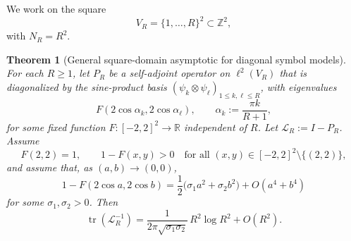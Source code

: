 \documentclass[reqno]{amsart}
\numberwithin{equation}{section}
\newtheorem{theorem}{Theorem}[section]
\theoremstyle{definition}
\theoremstyle{remark}
\DeclareMathOperator{\tr}{tr}
\begin{document}
We work on the square
\[
V_R=\{1,\dots,R\}^2 \subset \mathbb{Z}^2,
\]
with $N_R=R^2$.

\begin{theorem}[General square-domain asymptotic for diagonal symbol models]\label{thm:poly_square}
For each $R\ge1$, let $P_R$ be a self-adjoint operator on $\ell^2(V_R)$ that is diagonalized by the sine-product basis $(\psi_k\otimes\psi_\ell)_{1\le k,\ell\le R}$, with eigenvalues
\[
  F(2\cos\alpha_k,2\cos\alpha_\ell),
  \qquad
  \alpha_k:=\frac{\pi k}{R+1},
\]
for some fixed function $F:[-2,2]^2\to\mathbb R$ independent of $R$. Let $\mathcal L_R:=I-P_R$. Assume
\[
  F(2,2)=1,
  \qquad
  1-F(x,y)>0
  \quad\text{for all }(x,y)\in[-2,2]^2\setminus\{(2,2)\},
\]
and assume that, as $(a,b)\to(0,0)$,
\[
  1-F(2\cos a,2\cos b)
  =
  \frac12\bigl(\sigma_1 a^2+\sigma_2 b^2\bigr)+O(a^4+b^4)
\]
for some $\sigma_1,\sigma_2>0$. Then
\[
  \tr(\mathcal L_R^{-1})
  =
  \frac{1}{2\pi\sqrt{\sigma_1\sigma_2}}\,R^2\log R^2
  + O(R^2).
\]
\end{theorem}
\end{document}
